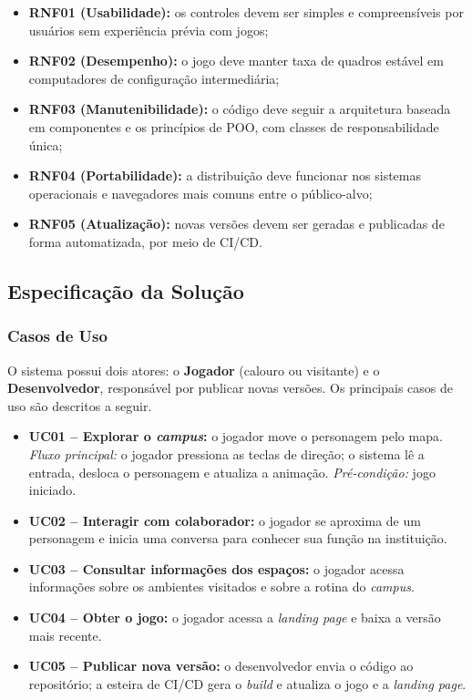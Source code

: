 \documentclass[12pt, a4paper]{article}
\begin{document}
\begin{itemize}
    \item \textbf{RNF01 (Usabilidade):} os controles devem ser simples e
    compreensíveis por usuários sem experiência prévia com jogos;

    \item \textbf{RNF02 (Desempenho):} o jogo deve manter taxa de quadros estável
    em computadores de configuração intermediária;

    \item \textbf{RNF03 (Manutenibilidade):} o código deve seguir a arquitetura
    baseada em componentes e os princípios de POO, com classes de responsabilidade
    única;

    \item \textbf{RNF04 (Portabilidade):} a distribuição deve funcionar nos
    sistemas operacionais e navegadores mais comuns entre o público-alvo;

    \item \textbf{RNF05 (Atualização):} novas versões devem ser geradas e
    publicadas de forma automatizada, por meio de CI/CD.
\end{itemize}

\subsection{Especificação da Solução}

\subsubsection{Casos de Uso}

O sistema possui dois atores: o \textbf{Jogador} (calouro ou visitante) e o
\textbf{Desenvolvedor}, responsável por publicar novas versões. Os principais
casos de uso são descritos a seguir.

\begin{itemize}
    \item \textbf{UC01 -- Explorar o \textit{campus}:} o jogador move o personagem
    pelo mapa. \textit{Fluxo principal:} o jogador pressiona as teclas de direção;
    o sistema lê a entrada, desloca o personagem e atualiza a animação. 
    \textit{Pré-condição:} jogo iniciado.

    \item \textbf{UC02 -- Interagir com colaborador:} o jogador se aproxima de
    um personagem e inicia uma conversa para conhecer sua função na instituição.

    \item \textbf{UC03 -- Consultar informações dos espaços:} o jogador acessa
    informações sobre os ambientes visitados e sobre a rotina do \textit{campus}.

    \item \textbf{UC04 -- Obter o jogo:} o jogador acessa a \textit{landing page}
    e baixa a versão mais recente.

    \item \textbf{UC05 -- Publicar nova versão:} o desenvolvedor envia o código
    ao repositório; a esteira de CI/CD gera o \textit{build} e atualiza o jogo e a
    \textit{landing page}.
\end{itemize}
\end{document}
